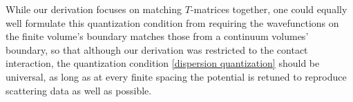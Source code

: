 While our derivation focuses on matching $T$-matrices together, one could equally well formulate this quantization condition from requiring the wavefunctions on the finite volume's boundary matches those from a continuum volumes' boundary, so that although our derivation was restricted to the contact interaction, the quantization condition \eqref{dispersion quantization} should be universal, as long as at every finite spacing the potential is retuned to reproduce scattering data as well as possible.
